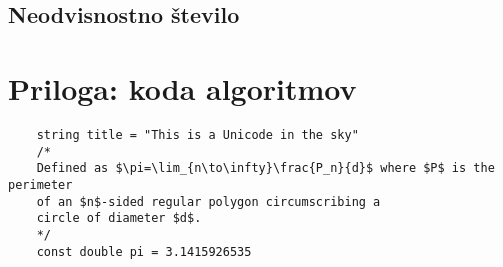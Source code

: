 \documentclass[12pt,a4paper,twoside]{article}
\theoremstyle{definition} %
\theoremstyle{plain} %
\numberwithin{equation}{section}  %
\begin{document}
\subsection{Neodvisnostno število}


\cleardoublepage                           %

\newpage

\appendix

\section{Priloga: koda algoritmov}

\begin{verbatim}
    string title = "This is a Unicode in the sky"
    /*
    Defined as $\pi=\lim_{n\to\infty}\frac{P_n}{d}$ where $P$ is the perimeter
    of an $n$-sided regular polygon circumscribing a
    circle of diameter $d$.
    */
    const double pi = 3.1415926535
\end{verbatim}
\end{document}
